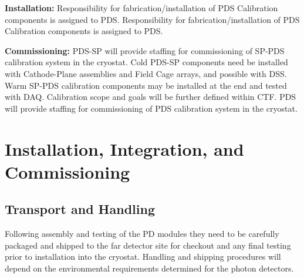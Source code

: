 \textbf{Installation: }Responsibility for fabrication/installation of PDS Calibration components is assigned to PDS. Responsibility for fabrication/installation of PDS Calibration components is assigned to PDS.

\textbf{Commissioning:} PDS-SP will provide staffing for commissioning of SP-PDS calibration system in the cryostat. Cold PDS-SP components need be installed with Cathode-Plane assemblies and Field Cage arrays, and possible with DSS. Warm SP-PDS calibration components may be installed at the end and tested with DAQ. Calibration scope and goals will be further defined within CTF. PDS will provide staffing for commissioning of PDS calibration system in the cryostat.


\section{Installation, Integration, and Commissioning}



\subsection{Transport and Handling}

Following assembly and testing of the PD modules they need to be carefully packaged and shipped to the far detector site for checkout and any final testing prior to installation into the cryostat. Handling and shipping procedures will depend on the environmental requirements determined for the photon detectors.

